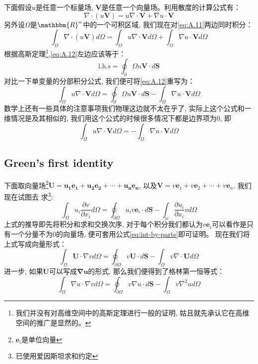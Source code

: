 下面假设$u$是任意一个标量场, $\mathbf{V}$是任意一个向量场。利用散度的计算公式有：
\begin{equation}
    \label{eq:A.11}
    \nabla\cdot\left(u\mathbf{V}\right)=u\nabla\cdot\mathbf{V}+\nabla u\cdot\mathbf{V}
\end{equation}
另外设$\Omega$是$\mathbbm{R}^n$中的一个可积区域, 我们现在对\ref{eq:A.11}两边同时积分：
\begin{equation}
    \label{eq:A.12}
    \int_\Omega \nabla\cdot\left(u\mathbf{V}\right)d\Omega =\int_\Omega u\nabla\cdot\mathbf{V} d\Omega +\int_\Omega\nabla u\cdot\mathbf{V}d\Omega
\end{equation}
根据高斯定理\footnote{我们并没有对高维空间中的高斯定理进行一般的证明, 姑且就先承认它在高维空间的推广是显然的。},\ref{eq:A.12}左边应该等于：
\[\text{l.h.s}=\oint_\partial\Omega u \mathbf{V}\cdot d\mathbf{S}\]
对比一下单变量的分部积分公式, 我们便可将\ref{eq:A.12}重写为：
\begin{equation}
    \label{eq:int-by-parts}
    \boxed{
        \int_\Omega u\nabla\cdot\mathbf{V} d\Omega=\oint_\partial\Omega u \mathbf{V}\cdot d\mathbf{S}-\int_\Omega\nabla u\cdot\mathbf{V}d\Omega
    }
\end{equation}
数学上还有一些具体的注意事项我们物理这边就不太在乎了, 实际上这个公式和一维情况是及其相似的, 我们用这个公式的时候很多情况下都是边界项为$0$, 即
\[\int_\Omega u\nabla\cdot\mathbf{V} d\Omega=-\int_\Omega\nabla u\cdot\mathbf{V}d\Omega\]
\subsection*{Green's first identity}
下面取向量场\footnote{$\mathbf{e}_i$是单位向量}$\mathbf{U=u_1\mathbf{e}_1+u_2\mathbf{e}_2+\cdots+u_n\mathbf{e}_n}$, 以及$\mathbf{V}=v\mathbf{e}_1+v\mathbf{e}_2+\cdots+v\mathbf{e}_n$. 我们现在试图去
求\footnote{已使用爱因斯坦求和约定}:
\[
    \int_\Omega u_i\frac{\partial v}{\partial x_i}d\Omega =\oint_{\partial\Omega} u_i v \mathbf{e}_i\cdot d\mathbf{S}-\int_\omega\frac{\partial u_i}{\partial x_i}v d\Omega
\]
上式的推导即先将积分和求和交换次序, 对于每个积分我们都认为$v\mathbf{e}_i$可以看作是只有一个分量不为0的向量场, 便可套用公式\ref{eq:int-by-parts}即可证明。
现在我们将上式写成向量形式：
\begin{equation}
    \int_{\Omega} \mathbf{U} \cdot \nabla v d \Omega=\oint_{\partial\Omega} v \mathbf{U} \cdot d\mathbf{S}-\int_{\Omega} v \nabla \cdot \mathbf{U} d \Omega
\end{equation}
进一步, 如果$\mathbf{U}$可以写成$\mathbf{\nabla u}$的形式, 那么我们便得到了格林第一恒等式：
\begin{equation}
    \int_{\Omega} \nabla u \cdot \nabla v d \Omega=\oint_{\partial\Omega} v \nabla u \cdot  d\mathbf{S}-\int_{\Omega} v \nabla^2 u d \Omega
\end{equation}


